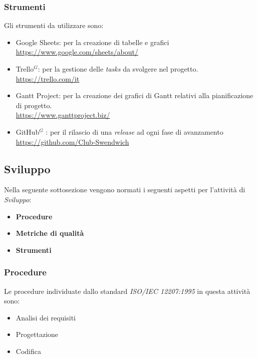 \subsubsection{Strumenti}
Gli strumenti da utilizzare sono:

\begin{itemize}
    \item Google Sheets: per la creazione di tabelle e grafici \\
    \href{https://www.google.com/sheets/about/}{https://www.google.com/sheets/about/}
    \item Trello$^G$: per la gestione delle \textit{tasks} da svolgere nel progetto.\\
    \href{https://trello.com/it}{https://trello.com/it}
    \item Gantt Project: per la creazione dei grafici di Gantt relativi alla pianificazione di progetto.\\
    \href{https://www.ganttproject.biz/}{https://www.ganttproject.biz/}
    \item GitHub$^G$ : per il rilascio di una \textit{release} ad ogni fase di avanzamento\\
    \href{https://github.com/Club-Swendwich}{https://github.com/Club-Swendwich}
\end{itemize}

\newpage
\subsection{Sviluppo}
Nella seguente sottosezione vengono normati i seguenti aspetti per l'attività di \textit{Sviluppo}:
\begin{itemize}
    \item \textbf{Procedure}
    \item \textbf{Metriche di qualità}
    \item \textbf{Strumenti}
\end{itemize}

\subsubsection{Procedure}

Le procedure individuate dallo standard \textit{ISO/IEC 12207:1995} in questa attività sono:
\begin{itemize}
    \item Analisi dei requisiti
    \item Progettazione
    \item Codifica
\end{itemize}


